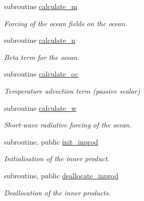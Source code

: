 \begin{DoxyCompactItemize}
subroutine \hyperlink{namespaceinprod__analytic_ad89fa4b40a4f55e72942f09427d2bafd}{calculate\+\_\+m}
\begin{DoxyCompactList}\small\item\em Forcing of the ocean fields on the ocean. \end{DoxyCompactList}\item 
subroutine \hyperlink{namespaceinprod__analytic_a76eeb8a6a44af38e397edd7e0617afca}{calculate\+\_\+n}
\begin{DoxyCompactList}\small\item\em Beta term for the ocean. \end{DoxyCompactList}\item 
subroutine \hyperlink{namespaceinprod__analytic_a189dc06ce5a20fe4f4c99ce982544f1c}{calculate\+\_\+oc}
\begin{DoxyCompactList}\small\item\em Temperature advection term (passive scalar) \end{DoxyCompactList}\item 
subroutine \hyperlink{namespaceinprod__analytic_ad275ee27fa04491805aa7a648183a754}{calculate\+\_\+w}
\begin{DoxyCompactList}\small\item\em Short-\/wave radiative forcing of the ocean. \end{DoxyCompactList}\item 
subroutine, public \hyperlink{namespaceinprod__analytic_a15216aea8062cfef76196c8453a4291c}{init\+\_\+inprod}
\begin{DoxyCompactList}\small\item\em Initialisation of the inner product. \end{DoxyCompactList}\item 
subroutine, public \hyperlink{namespaceinprod__analytic_a77718deee55b484b0946e6c8faf72cd6}{deallocate\+\_\+inprod}
\begin{DoxyCompactList}\small\item\em Deallocation of the inner products. \end{DoxyCompactList}\end{DoxyCompactItemize}
